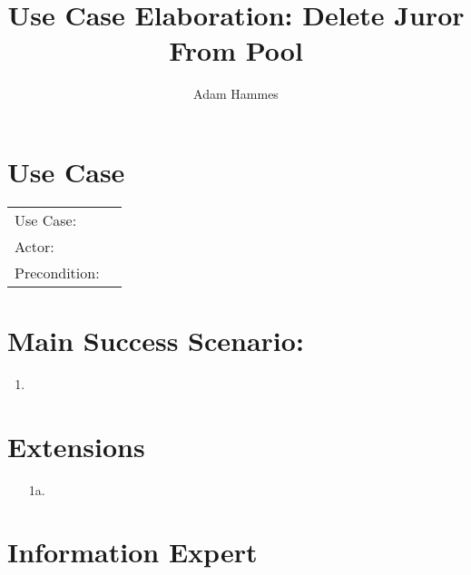 \documentclass{article}
\title{Use Case Elaboration: Delete Juror From Pool}
\author{Adam Hammes}
\begin{document}
\maketitle

\section*{Use Case}
\begin{tabular}{l l}
  Use Case:     & \\
  Actor:        & \\
  Precondition: & \\
\end{tabular}

\section*{Main Success Scenario:}
\begin{enumerate}
  \item 
\end{enumerate}

\section*{Extensions}
\begin{itemize}
  \item [1a.]

\end{itemize}

\section*{Information Expert}
\end{document}
